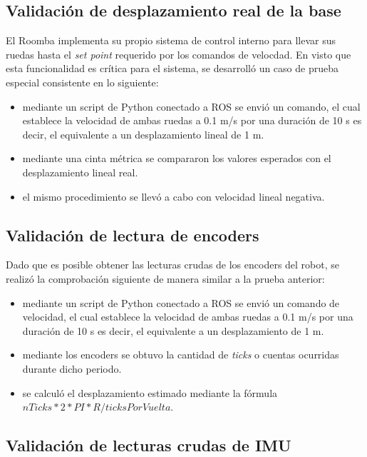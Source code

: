 \subsection{Validación de desplazamiento real de la base}

El Roomba implementa su propio sistema de control interno para llevar sus ruedas hasta el \textit{set point} requerido por los comandos de velocdad. En visto que esta funcionalidad es crítica para el sistema, se desarrolló un caso de prueba especial consistente en lo siguiente:

\begin{itemize}
    \item mediante un script de Python conectado a ROS se envió un comando, el cual establece la velocidad de ambas ruedas a 0.1 m/s por una duración de 10 s es decir, el equivalente a un desplazamiento lineal de 1 m.
    \item mediante una cinta métrica se compararon los valores esperados con el desplazamiento lineal real.
    \item el mismo procedimiento se llevó a cabo con velocidad lineal negativa.
\end{itemize}

\subsection{Validación de lectura de encoders}

Dado que es posible obtener las lecturas crudas de los encoders del robot, se realizó la comprobación siguiente de manera similar a la prueba anterior:

\begin{itemize}
    \item mediante un script de Python conectado a ROS se envió un comando de velocidad, el cual establece la velocidad de ambas ruedas a 0.1 m/s por una duración de 10 s es decir, el equivalente a un desplazamiento de 1 m.
    \item mediante los encoders se obtuvo la cantidad de \textit{ticks} o cuentas ocurridas durante dicho periodo.
    \item se calculó el desplazamiento estimado mediante la fórmula $nTicks * 2 * PI * R / ticksPorVuelta$.
\end{itemize}

\subsection{Validación de lecturas crudas de IMU}

